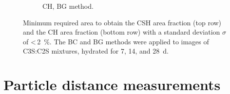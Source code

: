 \begin{figure}[htbp]
\begin{subfigure}[b]{0.49\textwidth}
        \caption{%
            \ac{CH}, \ac{BG} method.
        }
        \label{fig:areagrowth_ch}
    \end{subfigure}
	\caption{
        Minimum required area to obtain the \ac{CSH} area fraction (top row) and the \ac{CH} area fraction (bottom row) with a standard deviation $\sigma$ of <\,\qty{2}{\percent}.
        The \ac{BC} and \ac{BG} methods were applied to images of \ac{C3S}:\ac{C2S} mixtures, hydrated for \num{7}, \num{14}, and \qty{28}{\day}.
	}
    \label{fig:box_statistics_ch}
\end{figure}


\FloatBarrier
\section{Particle distance measurements}


